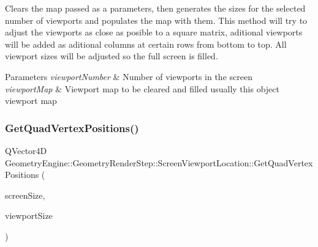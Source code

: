Clears the map passed as a parameters, then generates the sizes for the selected number of viewports and populates the map with them. This method will try to adjust the viewports as close as posible to a square matrix, aditional viewports will be added as aditional columns at certain rows from bottom to top. All viewport sizes will be adjusted so the full screen is filled. 
\begin{DoxyParams}{Parameters}
{\em viewport\+Number} & Number of viewports in the screen \\
\hline
{\em viewport\+Map} & Viewport map to be cleared and filled usually this object viewport map \\
\hline
\end{DoxyParams}
\mbox{\label{class_geometry_engine_1_1_geometry_render_step_1_1_screen_viewport_location_a2a958b2908d7e778f9e692cbe7dd9863}} 
\subsubsection{\texorpdfstring{GetQuadVertexPositions()}{GetQuadVertexPositions()}}
{\footnotesize\ttfamily Q\+Vector4D Geometry\+Engine\+::\+Geometry\+Render\+Step\+::\+Screen\+Viewport\+Location\+::\+Get\+Quad\+Vertex\+Positions (\begin{DoxyParamCaption}\item[{const Q\+Vector4D \&}]{screen\+Size,  }\item[{const Q\+Vector4D \&}]{viewport\+Size }\end{DoxyParamCaption})\hspace{0.3cm}{\ttfamily [static]}}

